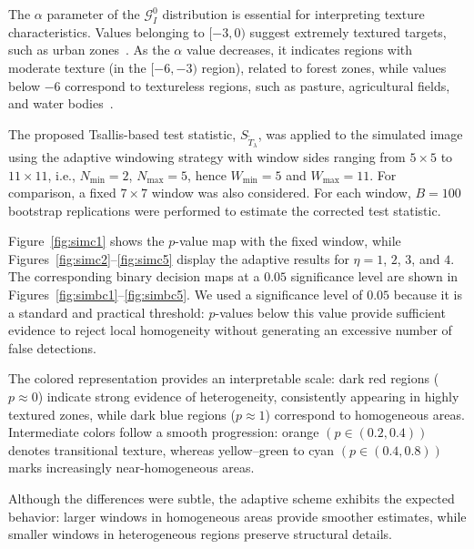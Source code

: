 \documentclass[
  lettersize  journal,
]{IEEEtran}%
\begin{document}
The \(\alpha\) parameter of the \(\mathcal{G}_I^0\) distribution is
essential for interpreting texture characteristics. Values belonging to
\([-3, 0)\) suggest extremely textured targets, such as urban
zones~. As the \(\alpha\) value
decreases, it indicates regions with moderate texture (in the
\([-6,-3)\) region), related to forest zones, while values below \(-6\)
correspond to textureless regions, such as pasture, agricultural fields,
and water bodies~.

The proposed Tsallis-based test statistic,
\(S_{\widetilde{T}_{\lambda}}\), was applied to the simulated image
using the adaptive windowing strategy with window sides ranging from
\(5\times5\) to \(11\times11\), i.e., \(N_{\min}=2\), \(N_{\max}=5\),
hence \(W_{\min}=5\) and \(W_{\max}=11\). For comparison, a fixed
\(7\times7\) window was also considered. For each window, \(B=100\)
bootstrap replications were performed to estimate the corrected test
statistic.

Figure~\ref{fig:simc1} shows the \(p\)-value map with the fixed window,
while Figures~\ref{fig:simc2}--\ref{fig:simc5} display the adaptive
results for \(\eta=1\), \(2\), \(3\), and \(4\). The corresponding
binary decision maps at a \(0.05\) significance level are shown in
Figures~\ref{fig:simbc1}--\ref{fig:simbc5}. We used a significance level
of \(0.05\) because it is a standard and practical threshold:
\(p\)-values below this value provide sufficient evidence to reject
local homogeneity without generating an excessive number of false
detections.

The colored representation provides an interpretable scale: dark red
regions (\(p \approx 0\)) indicate strong evidence of heterogeneity,
consistently appearing in highly textured zones, while dark blue regions
(\(p \approx 1\)) correspond to homogeneous areas. Intermediate colors
follow a smooth progression: orange \((p\in (0.2,0.4))\) denotes
transitional texture, whereas yellow--green to cyan \((p\in (0.4,0.8))\)
marks increasingly near-homogeneous areas.

Although the differences were subtle, the adaptive scheme exhibits the
expected behavior: larger windows in homogeneous areas provide smoother
estimates, while smaller windows in heterogeneous regions preserve
structural details.

\setlength{\dblfloatsep}{6pt}
\setlength{\dbltextfloatsep}{6pt}
\setlength{\textfloatsep}{6pt}
\captionsetup{font=footnotesize}
\captionsetup[sub]{aboveskip=2pt,belowskip=2pt}
\end{document}
